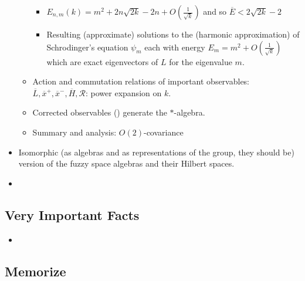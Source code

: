 \documentclass{article}
\newcommand{\cut}[1]{\overline{#1}}
\begin{document}
\begin{itemize}
\begin{itemize}
\begin{itemize}
            \item $E_{n,m}(k) = m^2 + 2n \sqrt{2k} - 2n + O(\frac{1}{\sqrt{k}})$ and so $\cut E < 2 \sqrt{2k} - 2$
            
            \item Resulting (approximate) solutions to the (harmonic approximation) of Schrodinger's equation $\psi_m$ each with energy $E_m = m^2 + O(\frac{1}{\sqrt{k}})$ which are exact eigenvectors of $L$ for the eigenvalue $m$.
            
            \end{itemize}
        
        \item Action and commutation relations of important observables: $\cut L, \cut x^+, \cut x^-, \cut H, \mathcal R$: power expansion on $k$.
        
        \item Corrected observables () generate the $*$-algebra.
        
        \item Summary and analysis: $O(2)$-covariance 
                
        \end{itemize}
        
    \item Isomorphic (as algebras and as representations of the group, they should be) version of the fuzzy space algebras and their Hilbert spaces.
    
    \item 
    
    \end{itemize}

\subsection*{Very Important Facts}

    \begin{itemize}

    \item 
    
    \end{itemize}



\subsection*{Memorize}
\end{document}
